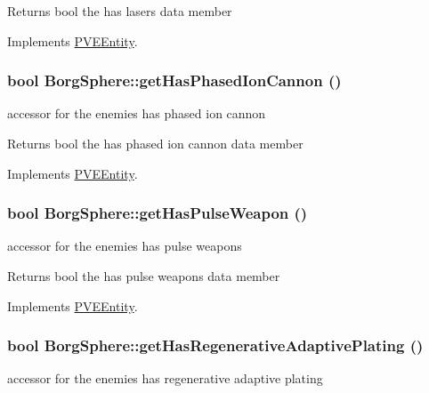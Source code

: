 \begin{DoxyReturn}{Returns}
bool the has lasers data member 
\end{DoxyReturn}


Implements \hyperlink{classPVEEntity}{PVEEntity}.

\hypertarget{classBorgSphere_a4fa0c397f2591be8dd30a26fdbf1aa8c}{
\subsubsection[{getHasPhasedIonCannon}]{\setlength{\rightskip}{0pt plus 5cm}bool BorgSphere::getHasPhasedIonCannon ()}}
\label{d6/ddd/classBorgSphere_a4fa0c397f2591be8dd30a26fdbf1aa8c}
accessor for the enemies has phased ion cannon

\begin{DoxyReturn}{Returns}
bool the has phased ion cannon data member 
\end{DoxyReturn}


Implements \hyperlink{classPVEEntity}{PVEEntity}.

\hypertarget{classBorgSphere_a664d07854cf4ccbc82794634946af59f}{
\subsubsection[{getHasPulseWeapon}]{\setlength{\rightskip}{0pt plus 5cm}bool BorgSphere::getHasPulseWeapon ()}}
\label{d6/ddd/classBorgSphere_a664d07854cf4ccbc82794634946af59f}
accessor for the enemies has pulse weapons

\begin{DoxyReturn}{Returns}
bool the has pulse weapons data member 
\end{DoxyReturn}


Implements \hyperlink{classPVEEntity}{PVEEntity}.

\hypertarget{classBorgSphere_aaf7c47b6913205611bd393345e6264fc}{
\subsubsection[{getHasRegenerativeAdaptivePlating}]{\setlength{\rightskip}{0pt plus 5cm}bool BorgSphere::getHasRegenerativeAdaptivePlating ()}}
\label{d6/ddd/classBorgSphere_aaf7c47b6913205611bd393345e6264fc}
accessor for the enemies has regenerative adaptive plating

